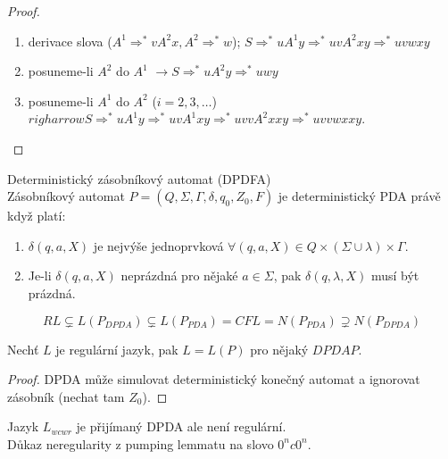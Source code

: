 \documentclass[../main.tex]{subfiles}
\begin{document}
\begin{theorem}
\begin{proof}
\begin{enumerate}
            \item derivace slova ($A^1 \Rightarrow^* vA^2x, A^2 \Rightarrow^* w$); $S \Rightarrow^* uA^1y \Rightarrow^* uvA^2xy \Rightarrow^* uvwxy$
            \item posuneme-li $A^2$ do $A^1$ $\rightarrow S \Rightarrow^* uA^2y \Rightarrow^* uwy$
            \item posuneme-li $A^1$ do $A^2$ ($i = 2,3,\dots$) $righarrow S \Rightarrow^* uA^1y \Rightarrow^* uvA^1xy \Rightarrow^* uvvA^2xxy \Rightarrow^* uvvwxxy$. 
        \end{enumerate}
    \end{proof}
\end{theorem}
\begin{definition}
    Deterministický zásobníkový automat (DPDFA)\\

    Zásobníkový automat $P = (Q,\Sigma, \Gamma, \delta, q_0,Z_0,F)$ je deterministický PDA právě když platí:
    \begin{enumerate}
        \item $\delta(q,a,X)$ je nejvýše jednoprvková $\forall (q,a,X) \in Q \times (\Sigma \cup {\lambda})\times \Gamma$.
        \item Je-li $\delta(q,a,X)$ neprázdná pro nějaké $a \in \Sigma$, pak $\delta(q,\lambda,X)$ musí být prázdná.
    \end{enumerate}
\end{definition}

\begin{theorem}
    \[RL \subsetneq L(P_{DPDA}) \subsetneq L(P_{PDA}) = CFL = N(P_{PDA}) \supsetneq N(P_{DPDA})\]

    Nechť $L$ je regulární jazyk, pak $L = L(P)$ pro nějaký $DPDA P$.
    \begin{proof}
        DPDA může simulovat deterministický konečný automat a ignorovat zásobník (nechat tam $Z_0$).
    \end{proof}
    \begin{remark}
        Jazyk $L_{wcwr}$ je přijímaný DPDA ale není regulární.\\

        Důkaz neregularity z pumping lemmatu na slovo $0^nc0^n$.
    \end{remark}
\end{theorem}
\end{document}
